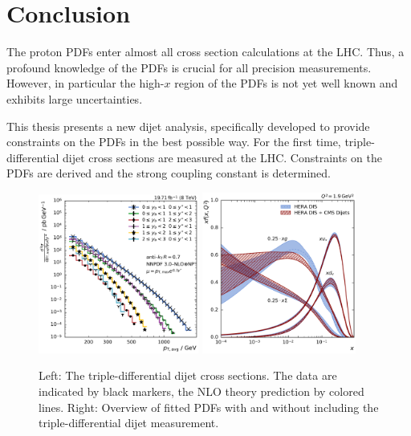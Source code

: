 
\chapter{Conclusion}

The proton PDFs enter almost all cross section calculations at the LHC. Thus, a
profound knowledge of the PDFs is crucial for all precision measurements.
However, in particular the high-$x$ region of the PDFs is not yet well known and
exhibits large uncertainties.

This thesis presents a new dijet analysis, specifically developed to provide
constraints on the PDFs in the best possible way. For the first time,
triple-differential dijet cross sections are measured at the LHC.
Constraints on the PDFs are derived and the strong coupling constant is
determined.
\\[-6pt]
\begin{figure}[btp]
    \centering
    \includegraphics[width=0.47\textwidth]{figures/measurement/ptavg_spectrum.pdf}\hfill
    \includegraphics[width=0.45\textwidth]{figures/pdf_constraints/pdfcomp_direct_overview_1.9.pdf}
    \caption[Summary plot of results]{Left:
    The triple-differential dijet cross sections. The data are indicated by black
    markers, the NLO theory prediction by colored lines. Right: Overview of
    fitted PDFs with and without including the triple-differential dijet
    measurement.}
    \label{fig:conclusion}
\end{figure}

